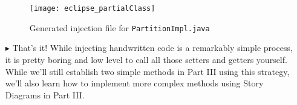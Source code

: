 \begin{itemize}
\begin{figure}[htbp]
    \centering
    \texttt{[image: eclipse\_partialClass]}
    \caption{Generated injection file for \texttt{PartitionImpl.java}}
    \label{fig:injection_partialClassPartition}
\end{figure}

\item[$\blacktriangleright$] That's it! While injecting handwritten code is a remarkably simple process, it is pretty boring and low level to call all those
setters and getters yourself. While we'll still establish two simple methods in Part III using this strategy, we'll also learn how to implement more complex
methods using Story Diagrams in Part III.
 
\end{itemize}
